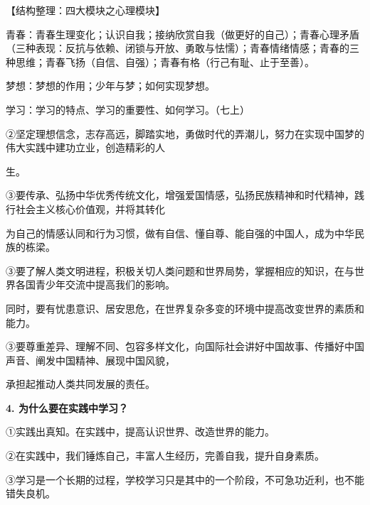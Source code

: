 \documentclass[lang=cn,11pt]{elegantbook}
\newcommand{\daofasym}[1]{{\daofasymbolfont #1}}
\newcommand{\daofasym}[1]{#1}
\begin{document}
【结构整理：四大模块之心理模块】\par

青春：青春生理变化；认识自我；接纳欣赏自我（做更好的自己）；青春心理矛盾（三种表现：反抗与依赖、闭锁与开放、勇敢与怯懦）；青春情绪情感；青春的三种思维；青春飞扬（自信、自强）；青春有格（行己有耻、止于至善）。\par

梦想：梦想的作用；少年与梦；如何实现梦想。\par

学习：学习的特点、学习的重要性、如何学习。（七上）\par

\daofasym{②}坚定理想信念，志存高远，脚踏实地，勇做时代的弄潮儿，努力在实现中国梦的伟大实践中建功立业，创造精彩的人\par

生。\par

\daofasym{③}要传承、弘扬中华优秀传统文化，增强爱国情感，弘扬民族精神和时代精神，践行社会主义核心价值观，并将其转化\par

为自己的情感认同和行为习惯，做有自信、懂自尊、能自强的中国人，成为中华民族的栋梁。\par

\daofasym{③}要了解人类文明进程，积极关切人类问题和世界局势，掌握相应的知识，在与世界各国青少年交流中提高我们的影响。\par

同时，要有忧患意识、居安思危，在世界复杂多变的环境中提高改变世界的素质和能力。\par

\daofasym{③}要尊重差异、理解不同、包容多样文化，向国际社会讲好中国故事、传播好中国声音、阐发中国精神、展现中国风貌，\par

承担起推动人类共同发展的责任。\par

\textbf{4. 为什么要在实践中学习？}\par

\daofasym{①}实践出真知。在实践中，提高认识世界、改造世界的能力。\par

\daofasym{②}在实践中，我们锤炼自己，丰富人生经历，完善自我，提升自身素质。\par

\daofasym{③}学习是一个长期的过程，学校学习只是其中的一个阶段，不可急功近利，也不能错失良机。\par
\end{document}
